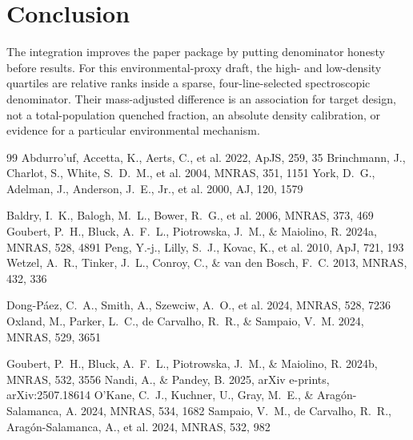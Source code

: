 \documentclass[twocolumn]{aastex702}
\begin{document}
\section{Conclusion}\label{sec:conclusion}
The integration improves the paper package by putting denominator honesty before results. For this environmental-proxy draft, the high- and low-density quartiles are relative ranks inside a sparse, four-line-selected spectroscopic denominator. Their mass-adjusted difference is an association for target design, not a total-population quenched fraction, an absolute density calibration, or evidence for a particular environmental mechanism.


\begin{thebibliography}{99}
 Abdurro'uf, Accetta, K., Aerts, C., et al. 2022, ApJS, 259, 35
 Brinchmann, J., Charlot, S., White, S.~D.~M., et al. 2004, MNRAS, 351, 1151
 York, D.~G., Adelman, J., Anderson, J.~E., Jr., et al. 2000, AJ, 120, 1579

 Baldry, I.~K., Balogh, M.~L., Bower, R.~G., et al. 2006, MNRAS, 373, 469
 Goubert, P.~H., Bluck, A.~F.~L., Piotrowska, J.~M., \& Maiolino, R. 2024a, MNRAS, 528, 4891
 Peng, Y.-j., Lilly, S.~J., Kovac, K., et al. 2010, ApJ, 721, 193
 Wetzel, A.~R., Tinker, J.~L., Conroy, C., \& van den Bosch, F.~C. 2013, MNRAS, 432, 336

 Dong-Páez, C.~A., Smith, A., Szewciw, A.~O., et al. 2024, MNRAS, 528, 7236
 Oxland, M., Parker, L.~C., de Carvalho, R.~R., \& Sampaio, V.~M. 2024, MNRAS, 529, 3651

 Goubert, P.~H., Bluck, A.~F.~L., Piotrowska, J.~M., \& Maiolino, R. 2024b, MNRAS, 532, 3556
 Nandi, A., \& Pandey, B. 2025, arXiv e-prints, arXiv:2507.18614
 O'Kane, C.~J., Kuchner, U., Gray, M.~E., \& Aragón-Salamanca, A. 2024, MNRAS, 534, 1682
 Sampaio, V.~M., de Carvalho, R.~R., Aragón-Salamanca, A., et al. 2024, MNRAS, 532, 982
\end{thebibliography}
\end{document}
